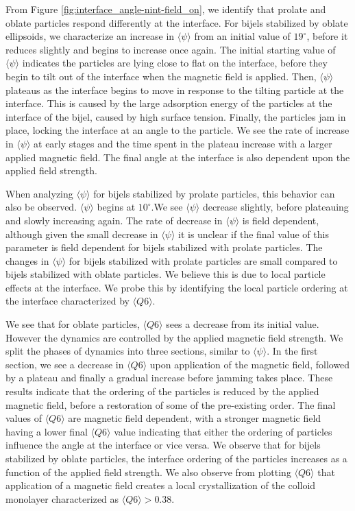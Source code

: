 From Figure \ref{fig:interface_angle-nint-field_on}, we identify that prolate and oblate particles respond differently at the interface. For
bijels stabilized by oblate ellipsoids, we characterize an increase in $\langle \psi \rangle$ from an initial value of \(19 ^{\circ}\),
before it reduces slightly and begins to increase once again. The initial starting value of $\langle \psi \rangle$ indicates the
particles are lying close to flat on the interface, before they begin to tilt out of the interface when the magnetic field is applied. Then,
$\langle \psi \rangle$ plateaus as the interface begins to move in response to the tilting particle at the interface. This is caused by the
large adsorption energy of the particles at the interface of the bijel, caused by high surface tension. Finally, the particles jam in place,
locking the interface at an angle to the particle. We see the rate of increase in $\langle \psi \rangle$ at early stages and the time spent
in the plateau increase with a larger applied magnetic field. The final angle at the interface is also dependent upon the applied field
strength.

When analyzing $\langle \psi \rangle$ for bijels stabilized by prolate particles, this behavior can also be observed. $\langle \psi \rangle$
begins at $10 ^{\circ}$.We see $\langle \psi \rangle$ decrease slightly, before plateauing and slowly increasing again. The rate of decrease in 
$\langle \psi \rangle$ is field dependent, although given the small decrease in $\langle \psi \rangle$ it is unclear if the final value of this parameter 
is field dependent for bijels stabilized with prolate particles. The changes in $\langle \psi \rangle$ for bijels stabilized with prolate particles are 
small compared to bijels stabilized with oblate particles. We believe this is due to local particle effects at the interface. We probe this by identifying 
the local particle ordering at the interface characterized by $\langle Q6 \rangle$.

We see that for oblate particles, $\langle Q6 \rangle$ sees a decrease from its initial value. However the dynamics are controlled by
the applied magnetic field strength. We split the phases of dynamics into three sections, similar to $\langle \psi \rangle$. In the first
section, we see a decrease in $\langle Q6 \rangle$ upon application of the magnetic field, followed by a plateau and finally a gradual increase
before jamming takes place. These results indicate that the ordering of the particles is reduced by the applied magnetic field, before a
restoration of some of the pre-existing order. The final values of $\langle Q6 \rangle$ are magnetic field dependent, with a stronger
magnetic field having a lower final $\langle Q6 \rangle$ value indicating that either the ordering of particles influence the angle at
the interface or vice versa. We observe that for bijels stabilized by oblate particles, the interface ordering of the particles increases as a
function of the applied field strength. We also observe from plotting $\langle Q6 \rangle$ that application of a magnetic field creates a
local crystallization of the colloid monolayer characterized as $\langle Q6 \rangle > 0.38$. \cite{toxvaerd_role_2020}

